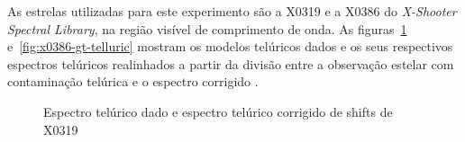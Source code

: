 As estrelas utilizadas para este experimento são a X0319 e a X0386 do \textit{X-Shooter Spectral Library}, na região visível de comprimento de onda. As figuras~\ref{fig:x0319-gt-telluric} e~\ref{fig:x0386-gt-telluric} mostram os modelos telúricos dados e os seus respectivos espectros telúricos realinhados a partir da divisão entre a observação estelar com contaminação telúrica e o espectro corrigido \citep{unpublished-xshooter-data-release}.

\begin{figure}[htb]
  \centering
  \hfill
  \caption{Espectro telúrico dado e espectro telúrico corrigido de shifts de X0319}
  \label{fig:x0319-gt-telluric}
\end{figure}

